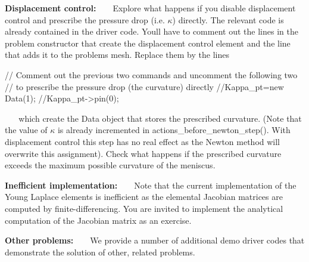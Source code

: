 \begin{DoxyEnumerate}
\item {\bfseries Displacement control\+:} ~\newline
~\newline
 Explore what happens if you disable displacement control and prescribe the pressure drop (i.\+e. $ \kappa $) directly. The relevant code is already contained in the driver code. You\textquotesingle{}ll have to comment out the lines in the problem constructor that create the displacement control element and the line that adds it to the problem\textquotesingle{}s mesh. Replace them by the lines ~\newline
~\newline
  
\begin{DoxyCodeInclude}
 \textcolor{comment}{// Comment out the previous two commands and uncomment the following two}
 \textcolor{comment}{// to prescribe the pressure drop (the curvature) directly}
 \textcolor{comment}{//Kappa\_pt=new Data(1);}
 \textcolor{comment}{//Kappa\_pt->pin(0);}

\end{DoxyCodeInclude}
 ~\newline
~\newline
 which create the {\ttfamily Data} object that stores the prescribed curvature. (Note that the value of $ \kappa $ is already incremented in {\ttfamily actions\+\_\+before\+\_\+newton\+\_\+step()}. With displacement control this step has no real effect as the Newton method will overwrite this assignment). Check what happens if the prescribed curvature exceeds the maximum possible curvature of the meniscus. ~\newline
~\newline

\item {\bfseries Inefficient implementation\+:} ~\newline
~\newline
 Note that the current implementation of the Young Laplace elements is inefficient as the elemental Jacobian matrices are computed by finite-\/differencing. You are invited to implement the analytical computation of the Jacobian matrix as an exercise. ~\newline
~\newline

\item {\bfseries Other problems\+:} ~\newline
~\newline
 We provide a number of additional demo driver codes that demonstrate the solution of other, related problems. ~\newline
~\newline


\end{DoxyEnumerate}
